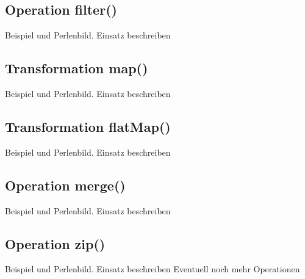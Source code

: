 \subsection{Operation filter()}
Beispiel und Perlenbild. Einsatz beschreiben
\subsection{Transformation map()}
Beispiel und Perlenbild. Einsatz beschreiben
\subsection{Transformation flatMap()}
Beispiel und Perlenbild. Einsatz beschreiben
\subsection{Operation merge()}
Beispiel und Perlenbild. Einsatz beschreiben
\subsection{Operation zip()}
Beispiel und Perlenbild. Einsatz beschreiben
Eventuell noch mehr Operationen

